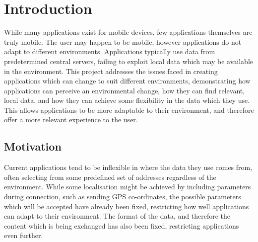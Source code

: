 \documentclass[12pt,twoside,notitlepage]{report}
\begin{document}
\bigskip
\bigskip
{}

\bigskip
\bigskip
{}

\cleardoublepage

\tableofcontents

\listoffigures

\newpage


\cleardoublepage        %

\setcounter{page}{1}
\pagestyle{headings}

\chapter{Introduction}

While many applications exist for mobile devices, few applications themselves are truly mobile. 
The user may happen to be mobile, however applications do not adapt to different environments. 
Applications typically use data from predetermined central servers, failing to exploit local data which may be available in the environment. 
This project addresses the issues faced in creating applications which can change to suit different environments, demonstrating how applications can perceive an environmental change, how they can find relevant, local data, and how they can achieve some flexibility in the data which they use. 
This allows applications to be more adaptable to their environment, and therefore offer a more relevant experience to the user. 

\section{Motivation}

Current applications tend to be inflexible in where the data they use comes from, often selecting from some predefined set of addresses regardless of the environment. 
While some localisation might be achieved by including parameters during connection, such as sending GPS co-ordinates, the possible parameters which will be accepted have already been fixed, restricting how well applications can adapt to their environment. 
The format of the data, and therefore the content which is being exchanged has also been fixed, restricting applications even further.
\end{document}
